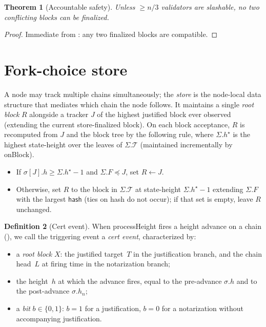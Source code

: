 \documentclass{article}
\newcommand{\T}[0]{\ensuremath{\mathcal{T}}}
\newcommand{\hash}{\mathsf{hash}}
\newcommand{\processHeight}{\textsf{processHeight}\xspace}
\newcommand{\onBlock}{\textsf{onBlock}\xspace}
\theoremstyle{plain}
\newtheorem{theorem}{Theorem}
\theoremstyle{definition}
\newtheorem{definition}[theorem]{Definition}
\theoremstyle{remark}
\begin{document}
\begin{theorem}[Accountable safety]\label{thm:safety}
Unless $\geq n/3$ validators are slashable, no two conflicting blocks can be finalized.
\end{theorem}

\begin{proof}
Immediate from : any two finalized blocks are compatible.
\end{proof}

\section{Fork-choice store}\label{sec:store}

A node may track multiple chains simultaneously; the \emph{store} is the node-local data structure that mediates which chain the node follows.
It maintains a single \emph{root block} $R$ alongside a tracker $J$ of the highest justified block ever observed (extending the current store-finalized block).
On each block acceptance, $R$ is recomputed from $J$ and the block tree by the following rule, where $\Sigma.h^\star$ is the highest state-height over the leaves of $\Sigma.\T$ (maintained incrementally by \onBlock).
\begin{itemize}
  \item If $\sigma[J].h \geq \Sigma.h^\star - 1$ and $\Sigma.F \preceq J$, set $R \gets J$.
  \item Otherwise, set $R$ to the block in $\Sigma.\T$ at state-height $\Sigma.h^\star - 1$ extending $\Sigma.F$ with the largest $\hash$ (ties on hash do not occur); if that set is empty, leave $R$ unchanged.
\end{itemize}

\begin{definition}[Cert event]\label{def:cert-event}
When \processHeight fires a height advance on a chain (), we call the triggering event a \emph{cert event}, characterized by:
\begin{itemize}
  \item a \emph{root block} $X$: the justified target~$T$ in the justification branch, and the chain head~$L$ at firing time in the notarization branch;
  \item the height~$h$ at which the advance fires, equal to the pre-advance $\sigma.h$ and to the post-advance $\sigma.h_n$;
  \item a \emph{bit} $b \in \{0, 1\}$: $b = 1$ for a justification, $b = 0$ for a notarization without accompanying justification.
\end{itemize}
\end{definition}
\end{document}
